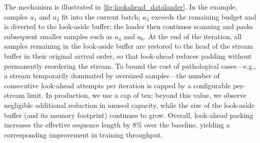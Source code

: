 \documentclass{llmxive}
\begin{document}
The mechanism is illustrated in \cref{fig:lookahead_dataloader}. In the example, samples $a_1$ and $a_2$ fit into the current batch; $a_3$ exceeds the remaining budget and is diverted to the look-aside buffer; the loader then continues scanning and packs subsequent smaller samples such as $a_4$ and $a_6$. At the end of the iteration, all samples remaining in the look-aside buffer are restored to the head of the stream buffer in their original arrival order, so that look-ahead reduces padding without permanently reordering the stream. To bound the cost of pathological cases---e.g., a stream temporarily dominated by oversized samples---the number of consecutive look-ahead attempts per iteration is capped by a configurable per-stream limit. In production, we use a cap of ten; beyond this value, we observe negligible additional reduction in unused capacity, while the size of the look-aside buffer (and its memory footprint) continues to grow. Overall, look-ahead packing increases the effective sequence length by $8\%$ over the baseline, yielding a corresponding improvement in training throughput.
\end{document}

